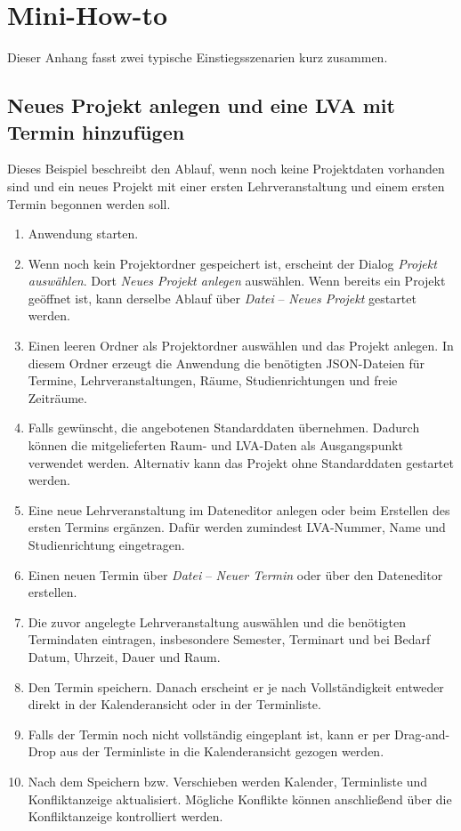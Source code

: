 \documentclass[12pt,a4paper]{article}
\begin{document}
\appendix

\section{Mini-How-to}

Dieser Anhang fasst zwei typische Einstiegsszenarien kurz zusammen. 

\subsection{Neues Projekt anlegen und eine LVA mit Termin hinzufügen}
\label{sec:howto-neues-projekt}

Dieses Beispiel beschreibt den Ablauf, wenn noch keine Projektdaten vorhanden sind und ein neues Projekt mit einer ersten Lehrveranstaltung und einem ersten Termin begonnen werden soll.

\begin{enumerate}
\item Anwendung starten.
\item Wenn noch kein Projektordner gespeichert ist, erscheint der Dialog \textit{Projekt auswählen}. Dort \textit{Neues Projekt anlegen} auswählen. Wenn bereits ein Projekt geöffnet ist, kann derselbe Ablauf über \textit{Datei} -- \textit{Neues Projekt} gestartet werden.
\item Einen leeren Ordner als Projektordner auswählen und das Projekt anlegen. In diesem Ordner erzeugt die Anwendung die benötigten JSON-Dateien für Termine, Lehrveranstaltungen, Räume, Studienrichtungen und freie Zeiträume.
\item Falls gewünscht, die angebotenen Standarddaten übernehmen. Dadurch können die mitgelieferten Raum- und LVA-Daten als Ausgangspunkt verwendet werden. Alternativ kann das Projekt ohne Standarddaten gestartet werden.
\item Eine neue Lehrveranstaltung im Dateneditor anlegen oder beim Erstellen des ersten Termins ergänzen. Dafür werden zumindest LVA-Nummer, Name und Studienrichtung eingetragen.
\item Einen neuen Termin über \textit{Datei} -- \textit{Neuer Termin} oder über den Dateneditor erstellen.
\item Die zuvor angelegte Lehrveranstaltung auswählen und die benötigten Termindaten eintragen, insbesondere Semester, Terminart und bei Bedarf Datum, Uhrzeit, Dauer und Raum.
\item Den Termin speichern. Danach erscheint er je nach Vollständigkeit entweder direkt in der Kalenderansicht oder in der Terminliste.
\item Falls der Termin noch nicht vollständig eingeplant ist, kann er per Drag-and-Drop aus der Terminliste in die Kalenderansicht gezogen werden.
\item Nach dem Speichern bzw. Verschieben werden Kalender, Terminliste und Konfliktanzeige aktualisiert. Mögliche Konflikte können anschließend über die Konfliktanzeige kontrolliert werden.
\end{enumerate}
\end{document}
